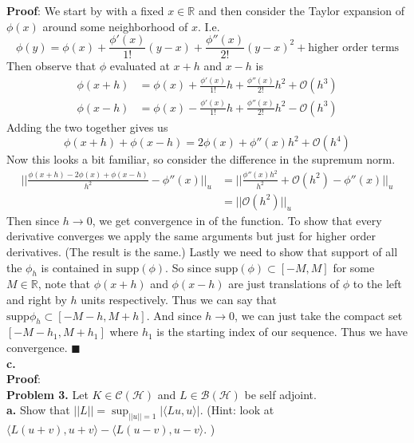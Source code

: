 \documentclass[11pt]{article}
\begin{document}
{\bf Proof}: We start by with a fixed $x\in\mathbb{R}$ and then consider the Taylor expansion of $\phi(x)$ around some neighborhood of $x$. I.e. 
\[ \phi(y) = \phi(x) + \frac{\phi'(x)}{1!}(y-x) + \frac{\phi''(x)}{2!}(y-x)^2 + \text{higher order terms} \]
Then observe that $\phi$ evaluated at $x+h$ and $x-h$ is
\begin{align*}
\phi(x+h) &= \phi(x) + \frac{\phi'(x)}{1!}h + \frac{\phi''(x)}{2!}h^2 + \mathcal{O}(h^3) \\
\phi(x-h) &= \phi(x) - \frac{\phi'(x)}{1!}h + \frac{\phi''(x)}{2!}h^2 - \mathcal{O}(h^3)
\end{align*}
Adding the two together gives us
\[ \phi(x+h) + \phi(x-h) = 2\phi(x) + \phi''(x)h^2 + \mathcal{O}(h^4) \]
Now this looks a bit familiar, so consider the difference in the supremum norm.
\begin{align*}
||\frac{\phi(x+h) -2\phi(x) + \phi(x-h)}{h^2} - \phi''(x)||_u &= ||\frac{\phi''(x)h^2}{h^2} + \mathcal{O}(h^2) - \phi''(x)||_u \\
&= ||\mathcal{O}(h^2)||_u
\end{align*}
Then since $h\to 0$, we get convergence in of the function. To show that every derivative converges we apply the same arguments but just for higher order derivatives. (The result is the same.) Lastly we need to show that support of all the $\phi_h$ is contained in $\text{supp}(\phi)$. So since $\text{supp}(\phi)\subset [-M,M]$ for some $M\in \mathbb{R}$, note that $\phi(x+h)$ and $\phi(x-h)$ are just translations of $\phi$ to the left and right by $h$ units respectively. Thus we can say that $\text{supp}\phi_h \subset [-M-h, M + h]$. And since $h\to 0$, we can just take the compact set $[-M - h_1, M + h_1]$ where $h_1$ is the starting index of our sequence. Thus we have convergence. $\blacksquare$
\\[16pt]


{\bf c.} 
\\[8pt]


{\bf Proof}: 
\\[16pt]


{\bf Problem 3.} Let $K\in\mathcal{C}(\mathcal{H})$ and $L\in \mathcal{B}(\mathcal{H})$ be self adjoint.
\\[4pt]


{\bf a.} Show that $||L|| = \sup_{||u|| = 1} |\langle Lu,u \rangle|$. (Hint: look at $\langle L(u+v), u+v \rangle - \langle L(u-v), u-v \rangle$. )
\\[8pt]
\end{document}
